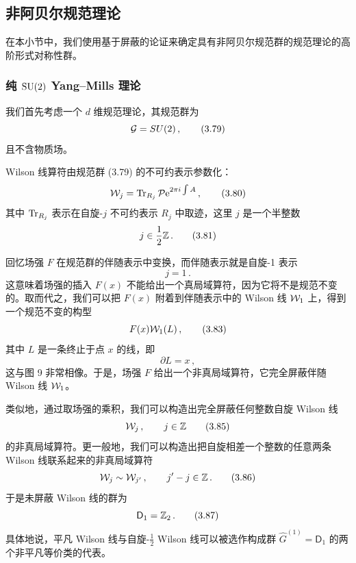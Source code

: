 \subsection{非阿贝尔规范理论}

在本小节中，我们使用基于屏蔽的论证来确定具有非阿贝尔规范群的规范理论的高阶形式对称性群。

\subsubsection{纯 $\mathrm{SU}(2)$ Yang--Mills 理论}

我们首先考虑一个 $d$ 维规范理论，其规范群为
\begin{equation}
  \mathcal{G}=SU(2)\,, \tag{3.79}
\end{equation}
且不含物质场。

 Wilson 线算符由规范群 (3.79) 的不可约表示参数化：
\begin{equation}
  \mathcal{W}_j=\operatorname{Tr}_{R_j}\mathcal{P}\mathrm{e}^{2\pi i\int A}\,, \tag{3.80}
\end{equation}
其中 $\operatorname{Tr}_{R_j}$ 表示在自旋-$j$ 不可约表示 $R_j$ 中取迹，这里 $j$ 是一个半整数
\begin{equation}
  j\in\frac{1}{2}\mathbb{Z}\,. \tag{3.81}
\end{equation}

 回忆场强 $F$ 在规范群的伴随表示中变换，而伴随表示就是自旋-1 表示
\begin{equation}
  j=1\,. \tag{3.82}
\end{equation}
这意味着场强的插入 $F(x)$ 不能给出一个真局域算符，因为它将不是规范不变的。取而代之，我们可以把 $F(x)$ 附着到伴随表示中的 Wilson 线 $\mathcal{W}_1$ 上，得到一个规范不变的构型
\begin{equation}
  F(x)\mathcal{W}_1(L)\,, \tag{3.83}
\end{equation}
其中 $L$ 是一条终止于点 $x$ 的线，即
\begin{equation}
  \partial L=x\,, \tag{3.84}
\end{equation}
这与图 9 非常相像。于是，场强 $F$ 给出一个非真局域算符，它完全屏蔽伴随 Wilson 线 $\mathcal{W}_1$。

 类似地，通过取场强的乘积，我们可以构造出完全屏蔽任何整数自旋 Wilson 线
\begin{equation}
  \mathcal{W}_j\,,\qquad j\in\mathbb{Z} \tag{3.85}
\end{equation}
的非真局域算符。更一般地，我们可以构造出把自旋相差一个整数的任意两条 Wilson 线联系起来的非真局域算符
\begin{equation}
  \mathcal{W}_j\sim \mathcal{W}_{j'}\,,\qquad j'-j\in\mathbb{Z}\,. \tag{3.86}
\end{equation}
于是未屏蔽 Wilson 线的群为
\begin{equation}
  \mathsf{D}_1=\mathbb{Z}_2\,. \tag{3.87}
\end{equation}
具体地说，平凡 Wilson 线与自旋-$\frac{1}{2}$ Wilson 线可以被选作构成群 $\widehat{G}^{(1)}=\mathsf{D}_1$ 的两个非平凡等价类的代表。

